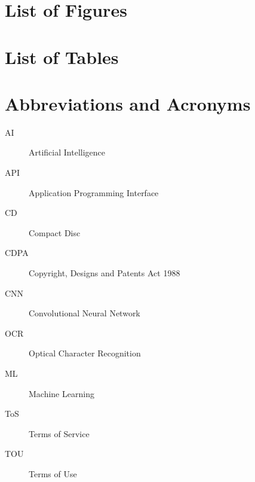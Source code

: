   \makeatletter
  \title{\xmp@Title}
  \studentid{\xmp@Author}
  \makeatother
  
  \maketitle
  
  
  \uomtoc
  
    \section*{List of Figures}
  
    \section*{List of Tables}
  
    \section*{Abbreviations and Acronyms}
  
      \begin{description}
        \item[AI] Artificial Intelligence
        \item[API] Application Programming Interface
        \item[CD] Compact Disc
        \item[CDPA] Copyright, Designs and Patents Act 1988
        \item[CNN] Convolutional Neural Network
        \item[OCR] Optical Character Recognition
        \item[ML] Machine Learning
        \item[ToS] Terms of Service
        \item[TOU] Terms of Use
      \end{description}
  
